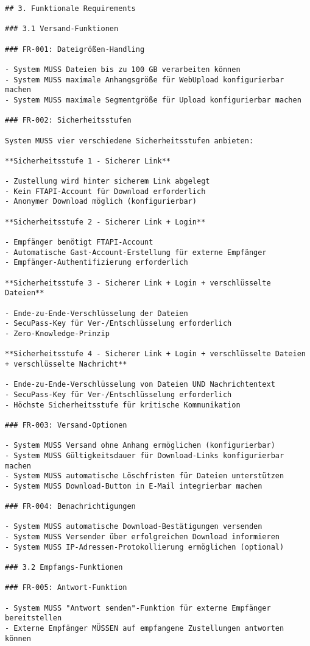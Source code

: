 \begin{Verbatim}[breaklines=true]
## 3. Funktionale Requirements

### 3.1 Versand-Funktionen

### FR-001: Dateigrößen-Handling

- System MUSS Dateien bis zu 100 GB verarbeiten können
- System MUSS maximale Anhangsgröße für WebUpload konfigurierbar machen
- System MUSS maximale Segmentgröße für Upload konfigurierbar machen

### FR-002: Sicherheitsstufen

System MUSS vier verschiedene Sicherheitsstufen anbieten:

**Sicherheitsstufe 1 - Sicherer Link**

- Zustellung wird hinter sicherem Link abgelegt
- Kein FTAPI-Account für Download erforderlich
- Anonymer Download möglich (konfigurierbar)

**Sicherheitsstufe 2 - Sicherer Link + Login**

- Empfänger benötigt FTAPI-Account
- Automatische Gast-Account-Erstellung für externe Empfänger
- Empfänger-Authentifizierung erforderlich

**Sicherheitsstufe 3 - Sicherer Link + Login + verschlüsselte Dateien**

- Ende-zu-Ende-Verschlüsselung der Dateien
- SecuPass-Key für Ver-/Entschlüsselung erforderlich
- Zero-Knowledge-Prinzip

**Sicherheitsstufe 4 - Sicherer Link + Login + verschlüsselte Dateien + verschlüsselte Nachricht**

- Ende-zu-Ende-Verschlüsselung von Dateien UND Nachrichtentext
- SecuPass-Key für Ver-/Entschlüsselung erforderlich
- Höchste Sicherheitsstufe für kritische Kommunikation

### FR-003: Versand-Optionen

- System MUSS Versand ohne Anhang ermöglichen (konfigurierbar)
- System MUSS Gültigkeitsdauer für Download-Links konfigurierbar machen
- System MUSS automatische Löschfristen für Dateien unterstützen
- System MUSS Download-Button in E-Mail integrierbar machen

### FR-004: Benachrichtigungen

- System MUSS automatische Download-Bestätigungen versenden
- System MUSS Versender über erfolgreichen Download informieren
- System MUSS IP-Adressen-Protokollierung ermöglichen (optional)

### 3.2 Empfangs-Funktionen

### FR-005: Antwort-Funktion

- System MUSS "Antwort senden"-Funktion für externe Empfänger bereitstellen
- Externe Empfänger MÜSSEN auf empfangene Zustellungen antworten können


\end{Verbatim}
